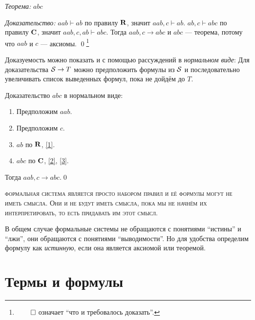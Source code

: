 {\it Теорема:} $abc$

{\it Доказательство:}
$aab\vdash ab$ по правилу $\mathbf{R}$, значит $aab,c\vdash ab$.
$ab,c\vdash abc$ по правилу $\mathbf{C}$, значит $aab,c,ab\vdash abc$.
Тогда $aab,c\to abc$ и $abc$ --- теорема, потому что $aab$ и $c$ --- аксиомы.
\qed\footnote{$\qed$ означает ``что и требовалось доказать''.}

Доказуемость можно показать и с помощью рассуждений в {\it нормальном виде}:
Для доказательства $\mathcal S\to T$ можно предположить формулы из $\mathcal S$ и последовательно
увеличивать список выведенных формул, пока не дойдём до $T$.

\pagebreak

Доказательство $abc$ в нормальном виде:
\begin{enumerate}[label=(\arabic*)]
	\item{}\label{1}Предположим $aab$.
	\item{}\label{2}Предположим $c$.
	\item{}\label{3}$ab$ по $\mathbf{R}$, \ref{1}.
	\item{}\label{4}$abc$ по $\mathbf{C}$, \ref{2}, \ref{3}.
\end{enumerate}

Тогда $aab,c\to abc$.\qed

\textsc{формальная система является просто набором правил и её формулы
	могут не иметь смысла. Они и не будут иметь смысла, пока мы не начнём их
	интерпретировать, то есть придавать им этот смысл.}

В общем случае формальные системы не обращаются с понятиями ``истины'' и ``лжи'',
они обращаются с понятиями ``выводимости''. Но для удобства определим формулу
как {\it истинную}, если она является аксиомой или теоремой.

\section{Термы и формулы}

